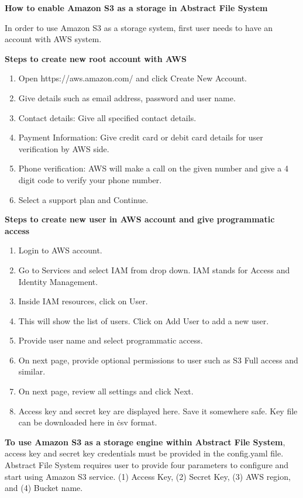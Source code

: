 \textbf{How to enable Amazon S3 as a storage in Abstract File System}


In order to use Amazon S3 as a storage system, first user needs to have an
account with AWS system.


\textbf{Steps to create new root account with AWS}

\begin{enumerate}
    \item Open https://aws.amazon.com/ and click Create New Account.
    \item Give details such as email address, password and user name.
    \item Contact details: Give all specified contact details.
    \item Payment Information: Give credit card or debit card details for user
verification by AWS side.
    \item       Phone verification: AWS will make a call on the given number
and give a 4 digit code to verify your phone number.
    \item Select a support plan and Continue.
\end{enumerate}


\textbf{Steps to create new user in AWS account and give programmatic access}


\begin{enumerate}
    \item Login to AWS account.
    \item Go to Services and select IAM from drop down. 
	IAM stands for Access and Identity Management.
    \item Inside IAM resources, click on User.
    \item This will show the list of users. Click on Add User to add a new 
user.
    \item Provide user name and select programmatic access.
    \item On next page, provide optional permissions to user such as S3 Full
access and similar.
    \item On next page, review all settings and click Next.
    \item Access key and secret key are displayed here. Save it somewhere safe.
Key file can be downloaded here in \.csv format.
\end{enumerate}



\textbf{To use Amazon S3 as a storage engine within Abstract File System}, 
access key and secret key credentials must be provided 
in the config.yaml file. Abstract File System requires user to 
provide four parameters to configure and start using Amazon S3 service.
(1) Access Key, 
(2) Secret Key,
(3) AWS region, and
(4) Bucket name.


